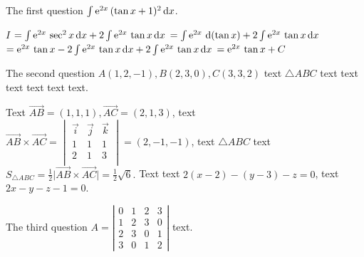 \documentclass[12pt,math=all]{randexam}
\begin{document}
\bigskip

\newpage


\begin{question}
The first question $\int\mathrm{e}^{2x}\,(\tan x+1)^2\mathop{}\!\mathrm{d} x$.
\end{question}

\smallskip

\begin{solution}
$I$ \? $=\int\mathrm{e}^{2x}\,\sec^2 x\mathop{}\!\mathrm{d} x+2\int\mathrm{e}^{2x}\,\tan x\mathop{}\!\mathrm{d} x$ 
\+ $=\int\e^{2x}\,\d(\tan x)+ 2\int\e^{2x}\,\tan x\dx$ 
\+ $=\mathrm{e}^{2x}\,\tan x - 2\int\mathrm{e}^{2x}\,\tan x\mathop{}\!\mathrm{d} x+ 2\int\mathrm{e}^{2x}\,\tan x\mathop{}\!\mathrm{d} x$ 
\+ $=\mathrm{e}^{2x}\,\tan x + C$ 
\end{solution}

\vfill

\begin{question}
The second question $A(1,2,-1), B(2,3,0),C(3,3,2)$ text $\triangle ABC$ text text text text text text.
\end{question}

\smallskip

\begin{solution}
Text $\overrightarrow{AB}=(1,1,1),\overrightarrow{AC}=(2,1,3)$, 
text $\overrightarrow{AB}\times \overrightarrow{AC}=\begin{vmatrix}
\vec{i}&\vec{j} &\vec{k}\\
1&1&1\\
2&1&3\\
\end{vmatrix}=(2,-1,-1)$, 
text $\triangle ABC$ text $S_{\triangle ABC}=\frac{1}{2}\big|\overrightarrow{AB}\times
\overrightarrow{AC}\big|=\frac{1}{2}\sqrt{6}.$ 
Text text $2(x-2)-(y-3)-z=0$, text $2x-y-z-1=0$. 
\end{solution}

\vfill

\newpage

\begin{question}
The third question $A = \left|\begin{array}{cccc}
  0 & 1 & 2 & 3\\
  1 & 2 & 3 & 0\\
  2 & 3 & 0 & 1\\
  3 & 0 & 1 & 2
\end{array}\right|$ text.
\end{question}
\end{document}
